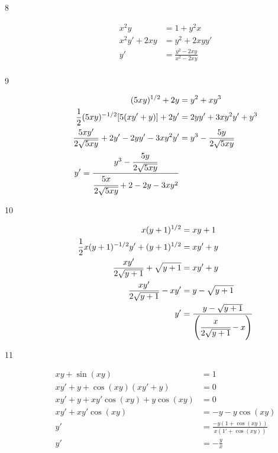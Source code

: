 \documentclass{exam}
\begin{document}
\begin{description}
\item[8]
\begin{align*}
  x^2y &= 1 + y^2x \\
  x^2y' + 2xy &= y^2 + 2xyy' \\
  y' &= \frac{y^2 - 2xy}{x^2 - 2xy} \\
\end{align*}

\item[9]
\begin{align*}
  (5xy)^{1/2} + 2y &= y^2 + xy^3 \\
  \frac{1}{2} (5xy)^{-1/2} [5(xy' + y)] + 2y' &= 2yy' + 3xy^2y' + y^3 \\
  \frac{5xy'}{2\sqrt{5xy}} + 2y' - 2yy' - 3xy^2y' &=  y^3 - \frac{5y}{2\sqrt{5xy}} \\
  y' = \frac{y^3 - \cfrac{5y}{2\sqrt{5xy}}}{\cfrac{5x}{2\sqrt{5xy}} + 2 - 2y - 3xy^2} \\
\end{align*}

\item[10]
\begin{align*}
  x(y+1)^{1/2} &= xy + 1 \\
  \frac{1}{2}x(y+1)^{-1/2} y' + (y+1)^{1/2} &= xy' + y \\
  \frac{xy'}{2 \sqrt{y+1}} + \sqrt{y+1} &= xy' + y \\
  \frac{xy'}{2 \sqrt{y+1}} - xy' &= y - \sqrt{y+1} \\
  y' &= \frac{y - \sqrt{y+1}}{\left( \cfrac{x}{2 \sqrt{y+1}} - x \right)} \\
\end{align*}

\item[11]
\begin{align*}
  xy  + \sin(xy) &= 1 \\
  xy' + y + \cos(xy)(xy' + y) &= 0 \\
  xy' + y + xy'\cos(xy) + y \cos(xy) &= 0 \\
  xy' + xy'\cos(xy) &= -y - y \cos(xy) \\
  y'  &= \frac{-y(1 + \cos(xy))}{x(1' + \cos(xy))} \\
  y'  &= - \frac{y}{x} \\
\end{align*}



\end{description}
\end{document}
